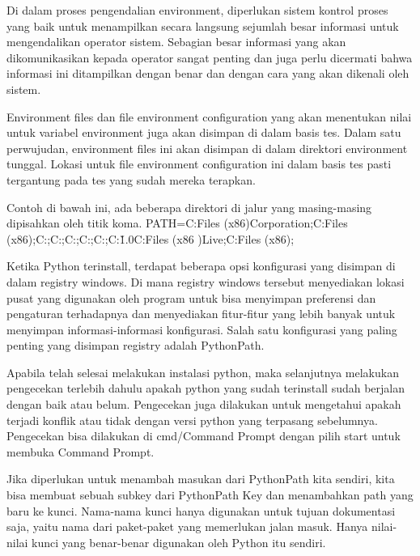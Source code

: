 Di dalam proses pengendalian environment, diperlukan sistem kontrol proses yang baik untuk menampilkan secara langsung sejumlah besar informasi untuk mengendalikan operator sistem. Sebagian besar informasi yang akan dikomunikasikan kepada operator sangat penting dan juga perlu dicermati bahwa informasi ini ditampilkan dengan benar dan dengan cara yang akan dikenali oleh sistem. \cite{kilgore1997directly}

Environment files dan file environment configuration yang akan menentukan nilai untuk variabel environment juga akan disimpan di dalam basis tes. Dalam satu perwujudan, environment files ini akan disimpan di dalam direktori environment tunggal. Lokasi untuk file environment configuration ini dalam basis tes pasti tergantung pada tes yang sudah mereka terapkan. \cite{janniro1997method}

Contoh di bawah ini, ada beberapa direktori di jalur yang masing-masing dipisahkan oleh titik koma.
PATH=C:\Program Files (x86)\NVIDIA Corporation\PhysX\Common;C:\Program Files (x86)\WinSCP;C:\Perl\site\bin;C:\Perl\bin;C:\WINDOWS{};C:\WINDOWS;C:\WINDOWS {}\Wbem;C:\WINDOWS{}\WindowsPowerShell\v1.0\;C:\Program Files (x86 )\Windows Live\Shared;C:\Program Files (x86)\FAHClient;

Ketika Python terinstall, terdapat beberapa opsi konfigurasi yang disimpan di dalam registry windows. Di mana registry windows tersebut menyediakan lokasi pusat yang digunakan oleh program untuk bisa menyimpan preferensi dan pengaturan terhadapnya dan menyediakan fitur-fitur yang lebih banyak untuk menyimpan informasi-informasi konfigurasi. Salah satu konfigurasi yang paling penting yang disimpan registry adalah PythonPath.\cite{hammond2000python}

Apabila telah selesai melakukan instalasi python, maka selanjutnya melakukan pengecekan terlebih dahulu apakah python yang sudah terinstall sudah berjalan dengan baik atau belum. Pengecekan juga dilakukan untuk mengetahui apakah terjadi konflik atau tidak dengan versi python yang terpasang sebelumnya. Pengecekan bisa dilakukan di cmd/Command Prompt dengan pilih start untuk membuka Command Prompt. \cite{mckinney2012python}

Jika diperlukan untuk menambah masukan dari PythonPath kita sendiri, kita bisa membuat sebuah subkey dari PythonPath Key dan menambahkan path yang baru ke kunci. Nama-nama kunci hanya digunakan untuk tujuan dokumentasi saja, yaitu nama dari paket-paket yang memerlukan jalan masuk. Hanya nilai-nilai kunci yang benar-benar digunakan oleh Python itu sendiri. \cite{hammond2000python}


